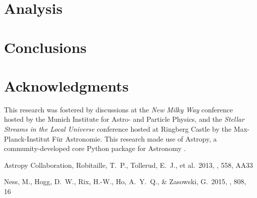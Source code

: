 \documentclass[useAMS,usenatbib]{mn2e}
\begin{document}




\section{Analysis}



\section{Conclusions}


\section*{Acknowledgments}
This research was fostered by discussions at the \textit{New Milky Way}
conference hosted by the Munich Institute for Astro- and Particle Physics, and
the \textit{Stellar Streams in the Local Universe} conference hosted at Ringberg
Castle by the Max-Planck-Institut F\"ur Astronomie. This research made use of 
Astropy, a community-developed core Python package for Astronomy \citep{astropy}.

\begin{thebibliography}{99}
 Astropy Collaboration, Robitaille, T.~P., Tollerud, E.~J., et al.\ 2013, \aap, 558, AA33

 Ness, M., Hogg, D.~W., 
Rix, H.-W., Ho, A.~Y.~Q., \& Zasowski, G.\ 2015, \apj, 808, 16 
\end{thebibliography}


\label{lastpage}
\end{document}
